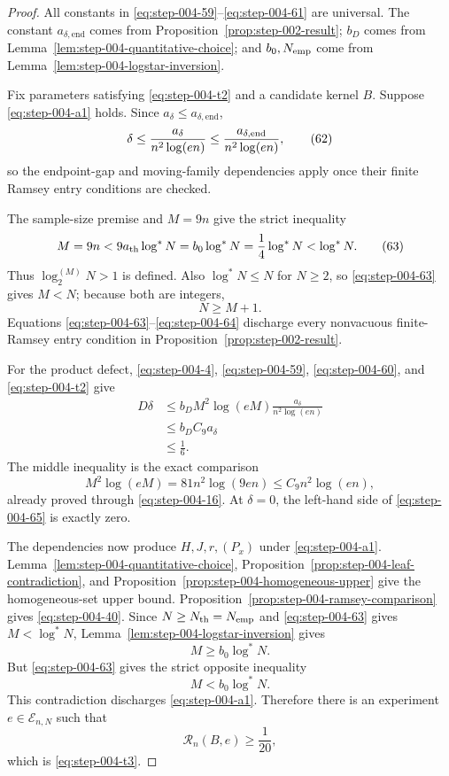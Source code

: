 \begin{proof}

All constants in \eqref{eq:step-004-59}--\eqref{eq:step-004-61} are universal.  The constant \(a_{\delta,\mathrm{end}}\) comes from Proposition~\ref{prop:step-002-result}; \(b_D\) comes from Lemma~\ref{lem:step-004-quantitative-choice}; and \(b_0,N_{\rm emp}\) come from Lemma~\ref{lem:step-004-logstar-inversion}.

Fix parameters satisfying \eqref{eq:step-004-t2} and a candidate kernel \(B\). Suppose \eqref{eq:step-004-a1} holds. Since \(a_\delta\le a_{\delta,\mathrm{end}}\),
\[
\delta
\le\frac{a_\delta}{n^2\log(en)}
\le\frac{a_{\delta,{\rm end}}}{n^2\log(en)},
\tag{62}\label{eq:step-004-62}
\]
so the endpoint-gap and moving-family dependencies apply once their finite Ramsey entry conditions are checked.

The sample-size premise and \(M=9n\) give the strict inequality
\[
M=9n
<9a_{\rm th}\log^*N
=b_0\log^*N
=\frac14\log^*N
<\log^*N.
\tag{63}\label{eq:step-004-63}
\]
Thus \(\log_2^{(M)}N>1\) is defined. Also \(\log^*N\le N\) for \(N\ge 2\), so \eqref{eq:step-004-63} gives \(M<N\); because both are integers,
\[
N\ge M+1.
\tag{64}\label{eq:step-004-64}
\]
Equations \eqref{eq:step-004-63}--\eqref{eq:step-004-64} discharge every nonvacuous finite-Ramsey entry condition in Proposition~\ref{prop:step-002-result}.

For the product defect, \eqref{eq:step-004-4}, \eqref{eq:step-004-59}, \eqref{eq:step-004-60}, and \eqref{eq:step-004-t2} give
\[
\begin{aligned}
D\delta
&\le b_DM^2\log(eM)
\frac{a_\delta}{n^2\log(en)}\\
&\le b_DC_9a_\delta\\
&\le\frac16.
\end{aligned}
\tag{65}\label{eq:step-004-65}
\]
The middle inequality is the exact comparison
\[
M^2\log(eM)
=81n^2\log(9en)
\le C_9n^2\log(en),
\tag{66}\label{eq:step-004-66}
\]
already proved through \eqref{eq:step-004-16}. At \(\delta=0\), the left-hand side of \eqref{eq:step-004-65} is exactly zero.

The dependencies now produce \(H,J,r,(P_x)\) under \eqref{eq:step-004-a1}. Lemma~\ref{lem:step-004-quantitative-choice}, Proposition~\ref{prop:step-004-leaf-contradiction}, and Proposition~\ref{prop:step-004-homogeneous-upper} give the homogeneous-set upper bound. Proposition~\ref{prop:step-004-ramsey-comparison} gives \eqref{eq:step-004-40}. Since \(N\ge N_{\rm th}=N_{\rm emp}\) and \eqref{eq:step-004-63} gives \(M<\log^*N\), Lemma~\ref{lem:step-004-logstar-inversion} gives
\[
M\ge b_0\log^*N.
\tag{67}\label{eq:step-004-67}
\]
But \eqref{eq:step-004-63} gives the strict opposite inequality
\[
M<b_0\log^*N.
\tag{68}\label{eq:step-004-68}
\]
This contradiction discharges \eqref{eq:step-004-a1}. Therefore there is an experiment \(e \in \mathcal E_{n,N}\) such that
\[
\mathcal R_n(B,e)\ge\frac1{20},
\]
which is \eqref{eq:step-004-t3}.


\end{proof}
